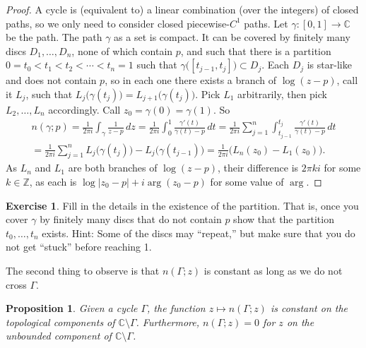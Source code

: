 \documentclass[12pt,openany]{book}
\newcommand{\sabs}[1]{\lvert {#1} \rvert}
\newcommand{\C}{{\mathbb{C}}}
\newcommand{\Z}{{\mathbb{Z}}}
\newcommand{\myquote}[1]{``#1''}
\theoremstyle{plain}
\newtheorem{prop}[thm]{Proposition}
\theoremstyle{remark}
\theoremstyle{definition}
\newenvironment{exbox}{%
    \def\FrameCommand{\vrule width 1pt \relax\hspace{10pt}}%
    \MakeFramed{\advance\hsize-\width\FrameRestore}%
}{%
    \endMakeFramed
}
\theoremstyle{exercise}
\newtheorem{exercise}{Exercise}[section]
\theoremstyle{example}
\begin{document}
\begin{proof}
A cycle is (equivalent to) a linear combination (over the integers) of closed paths,
so we only need to consider closed piecewise-$C^1$ paths.
Let $\gamma \colon [0,1] \to \C$ be the path.
The path $\gamma$ as a set is compact.  It can be covered by finitely many
discs $D_1,\ldots,D_n$, none of which contain $p$, and such that there is a
partition $0 = t_0 < t_1 < t_2 < \cdots < t_n = 1$ such that
$\gamma\bigl([t_{j-1},t_j]\bigr) \subset D_j$.  Each $D_j$ is star-like and
does not contain $p$,
so in each one there exists a branch of $\log (z-p)$, call it $L_j$,
such that $L_j\bigl(\gamma(t_j)\bigr) = L_{j+1}\bigl(\gamma(t_j)\bigr)$.
Pick $L_1$ arbitrarily, then pick $L_2,\ldots,L_n$ accordingly.
Call $z_0 = \gamma(0) = \gamma(1)$.  So
\begin{multline*}
n(\gamma;p)
=
\frac{1}{2\pi i} \int_\gamma \frac{1}{z-p} \, dz
=
\frac{1}{2\pi i} \int_0^1 \frac{\gamma'(t)}{\gamma(t)-p} \, dt
=
\frac{1}{2\pi i} \sum_{j=1}^n \int_{t_{j-1}}^{t_j} \frac{\gamma'(t)}{\gamma(t)-p} \, dt
\\
=
\frac{1}{2\pi i} \sum_{j=1}^n L_j\bigl(\gamma(t_j)\bigr) -
L_j\bigl(\gamma(t_{j-1})\bigr)
=
\frac{1}{2\pi i} \bigl( L_n(z_0) - L_1(z_0) \bigr) .
\end{multline*}
As $L_n$ and $L_1$ are both branches of $\log(z-p)$, their difference is
$2\pi k i$ for some $k \in \Z$, as each is
$\log\sabs{z_0-p} + i \arg (z_0-p)$ for some value of
$\arg$.
\end{proof}

\begin{exbox}
\begin{exercise}
Fill in the details in the existence of the partition.  That is, once you
cover $\gamma$ by finitely many discs that do not contain $p$ show that
the partition $t_0,\ldots,t_n$ exists.  Hint: Some of the discs may
\myquote{repeat,} but make sure that you do not get \myquote{stuck} before reaching 1.
\end{exercise}
\end{exbox}

The second thing to observe is that $n(\Gamma;z)$ is constant as long as we
do not cross $\Gamma$.

\begin{prop} \label{prop:windingconstant}
Given a cycle $\Gamma$,
the function $z \mapsto n(\Gamma;z)$ is constant on the
topological components of $\C \setminus \Gamma$.
Furthermore, $n(\Gamma;z) = 0$ for $z$ on the unbounded component
of $\C \setminus \Gamma$.
\end{prop}
\end{document}
